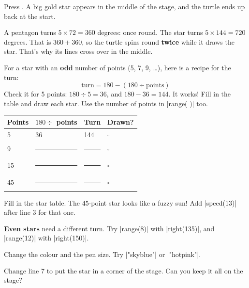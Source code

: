 Press \playbtn. A big gold star appears in the middle of the stage, and the turtle ends up back at the start.

\begin{think}
A pentagon turns $5 \times 72 = 360$ degrees: once round. The star turns $5 \times 144 = 720$ degrees. That is $360 + 360$, so the turtle spins round \textbf{twice} while it draws the star. That's why its lines cross over in the middle.
\end{think}


For a star with an \textbf{odd} number of points (5, 7, 9, \ldots), here is a recipe for the turn:
\[ \text{turn} = 180 - (180 \div \text{points}) \]
Check it for 5 points: $180 \div 5 = 36$, and $180 - 36 = 144$. It works! Fill in the table and draw each star. Use the number of points in \py|range( )| too.

\begin{center}
\renewcommand{\arraystretch}{1.3}
\begin{tabular}{P{2.6cm} P{4.2cm} P{3.4cm} P{1.6cm}}
\toprule
\textbf{Points} & \textbf{$180 \div$ points} & \textbf{Turn} & \textbf{Drawn?} \\
 & 36 & 144 & $\square$ \\
9 & \rule{2.2cm}{0.5pt} & \rule{2.2cm}{0.5pt} & $\square$ \\
15 & \rule{2.2cm}{0.5pt} & \rule{2.2cm}{0.5pt} & $\square$ \\
45 & \rule{2.2cm}{0.5pt} & \rule{2.2cm}{0.5pt} & $\square$ \\
\bottomrule
\end{tabular}
\end{center}

\begin{challenge}
\tick Fill in the star table. The 45-point star looks like a fuzzy sun! Add \py|speed(13)| after line 3 for that one.\par
\tick \textbf{Even stars} need a different turn. Try \py|range(8)| with \py|right(135)|, and \py|range(12)| with \py|right(150)|.\par
\tick Change the colour and the pen size. Try \py|"skyblue"| or \py|"hotpink"|.\par
\tick Change line 7 to put the star in a corner of the stage. Can you keep it all on the stage?
\end{challenge}


